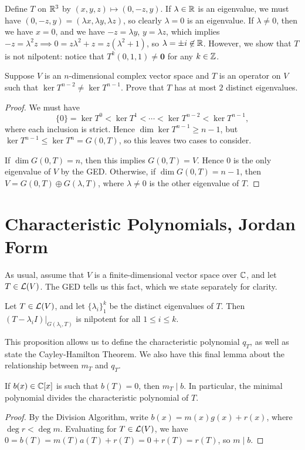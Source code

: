 \documentclass{article}
\begin{document}
\begin{solution}
Define $T$ on $\mathbb R^3$ by $(x,y,z)\mapsto (0, -z, y)$. If $\lambda\in\mathbb R$ is an eigenvalue, we must have $(0, -z, y) = (\lambda x,\lambda y, \lambda z)$, so clearly $\lambda = 0$ is an eigenvalue. If $\lambda\neq 0$, then we have $x=0$, and we have $-z = \lambda y$, $y = \lambda z$, which implies $-z = \lambda^2z \implies 0 = z\lambda^2+z = z(\lambda^2+1)$, so $\lambda = \pm i\not\in \mathbb R$. However, we show that $T$ is not nilpotent: notice that $T^k(0, 1,1) \neq\mathbf 0$ for any $k\in \mathbb Z$.
\end{solution}
\begin{example}[8B.4]
Suppose $V$ is an $n$-dimensional complex vector space and $T$ is an operator on $V$ such that $\ker T^{n-2}\neq \ker T^{n-1}$. Prove that $T$ has at most $2$ distinct eigenvalues.
\end{example}
\begin{proof}
We must have
$$\{0\} = \ker T^0 < \ker T^1 < \cdots < \ker T^{n-2} < \ker T^{n-1},$$
where each inclusion is strict. Hence $\dim \ker T^{n-1} \geq n-1$, but $\ker T^{n-1} \leq \ker T^n = G(0,T)$, so this leaves two cases to consider.

If $\dim G(0,T) = n$, then this implies $G(0,T) = V$. Hence $0$ is the only eigenvalue of $V$ by the GED. Otherwise, if $\dim G(0, T) = n-1$, then $V = G(0, T)\oplus G(\lambda, T)$, where $\lambda\neq 0$ is the other eigenvalue of $T$.
\end{proof}
\section{Characteristic Polynomials, Jordan Form}
As usual, assume that $V$ is a finite-dimensional vector space over $\mathbb C$, and let $T\in\mathcal L(V)$. The GED tells us this fact, which we state separately for clarity.
\begin{proposition}
Let $T\in\mathcal L(V)$, and let $\{\lambda_i\}_1^k$ be the distinct eigenvalues of $T$. Then $(T-\lambda_iI)|_{ G(\lambda_i, T)}$ is nilpotent for all $1\leq i\leq k$.
\end{proposition}

This proposition allows us to define the characteristic polynomial $q_T$, as well as state the Cayley-Hamilton Theorem. We also have this final lemma about the relationship between $m_T$ and $q_T$.
\begin{lemma}
If $b(x)\in \mathbb C[x]$ is such that $b(T) = 0$, then $m_T \mid b$. In particular, the minimal polynomial divides the characteristic polynomial of $T$.
\end{lemma}
\begin{proof}
By the Division Algorithm, write $b(x) = m(x)g(x) + r(x)$, where $\deg r < \deg m$. Evaluating for $T\in\mathcal L(V)$, we have $0=b(T) = m(T)a(T) + r(T) = 0 + r(T) = r(T)$, so $m \mid b$.
\end{proof}
\end{document}
